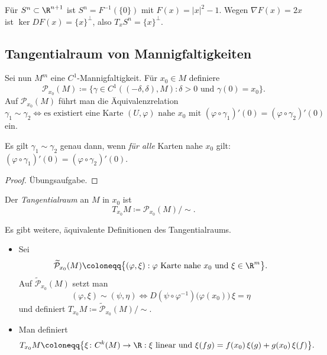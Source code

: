 \documentclass[11pt]{article}
\begin{document}
\begin{example}
  Für $S^n \subset \R^{n+1}$ ist $S^n = F^{-1}(\{0\})$ mit $F(x) = \lvert x \rvert^2 - 1$. Wegen $\nabla F(x) = 2x$ ist $\ker DF(x) = \{x\}^\perp$, also $T_x S^n = \{x\}^\perp$.
\end{example}


\subsection{Tangentialraum von Mannigfaltigkeiten}

Sei nun $M^m$ eine $C^1$-Mannigfaltigkeit. Für $x_0 \in M$ definiere
\[ \mathcal{P}_{x_0}(M) \coloneqq \bigl\{ \gamma \in C^1((-\delta, \delta), M) : \delta > 0 \text{ und } \gamma(0) = x_0 \bigr\}. \]
Auf $\mathcal{P}_{x_0}(M)$ führt man die Äquivalenzrelation
\[ \gamma_1 \sim \gamma_2 \iff \text{es existiert eine Karte } (U, \varphi) \text{ nahe } x_0 \text{ mit } (\varphi \circ \gamma_1)'(0) = (\varphi \circ \gamma_2)'(0) \]
ein.


\begin{note}
  Es gilt $\gamma_1 \sim \gamma_2$ genau dann, wenn \textit{für alle} Karten nahe $x_0$ gilt: $(\varphi \circ \gamma_1)'(0) = (\varphi \circ \gamma_2)'(0)$.
\end{note}


\begin{proof}
  Übungsaufgabe.
\end{proof}

\begin{definition}[Tangentialraum]\Theorem
  Der \emph{Tangentialraum} an $M$ in $x_0$ ist
  \[ T_{x_0} M \coloneqq \mathcal{P}_{x_0}(M) / {\sim}. \]
\end{definition}




\begin{note}
  Es gibt weitere, äquivalente Definitionen des Tangentialraums.
  \begin{itemize}
    \item Sei
      \[ \widetilde{\mathcal{P}}_{x_0}(M) \coloneqq \bigl\{ (\varphi, \xi) : \varphi \text{ Karte nahe } x_0 \text{ und } \xi \in \R^m \bigr\}. \]
      Auf $\widetilde{\mathcal{P}}_{x_0}(M)$ setzt man
      \[ (\varphi, \xi) \sim (\psi, \eta) \iff D(\psi \circ \varphi^{-1})\bigl(\varphi(x_0)\bigr)\, \xi = \eta \]
      und definiert $T_{x_0} M \coloneqq \widetilde{\mathcal{P}}_{x_0}(M) / {\sim}$.
    \item Man definiert
      \[ T_{x_0} M \coloneqq \bigl\{ \xi \colon C^k(M) \to \R : \xi \text{ linear und } \xi(fg) = f(x_0)\, \xi(g) + g(x_0)\, \xi(f) \bigr\}. \]
  \end{itemize}
\end{note}
\end{document}
